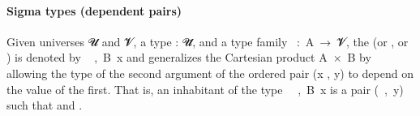 \paragraph*{Sigma types (dependent pairs)} %

Given universes \ab 𝓤 and \ab 𝓥, a type  \as : \ab 𝓤\af ̇, and a type family ~\as :~\ab A~\as →~\ab 𝓥\af ̇, the  (or , or ) is denoted by ~ ,~\ab B~\ab x and generalizes the Cartesian product \ab A~\af ×~\ab B by allowing the type  of the second argument of the ordered pair (\ab x \af , \ab y) to depend on the value  of the first. That is, an inhabitant of the type ~~,~\ab B~\ab x is a pair (~\af ,~\ab y) such that  and .

